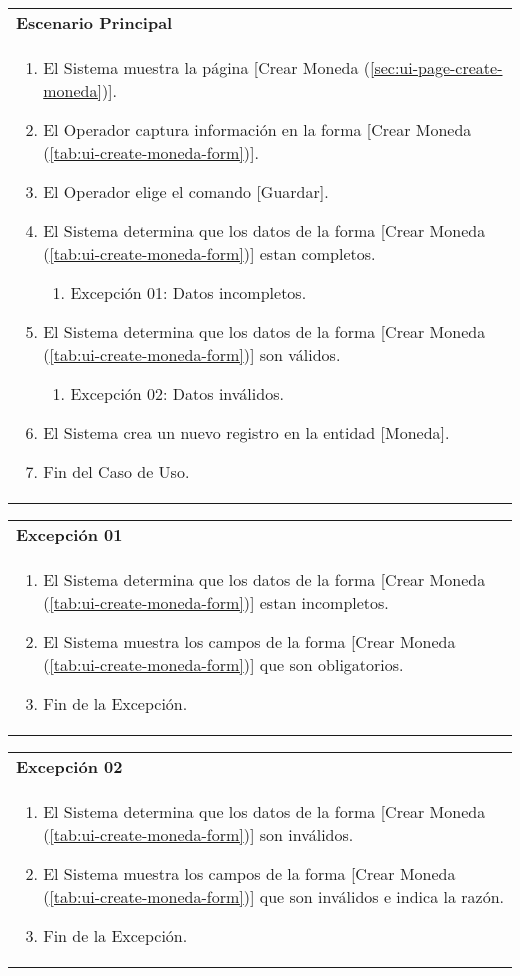 \begin{tabular}{ p{15.5cm} }
	\textbf{Escenario Principal} \\
	\begin{enumerate}
		\item El Sistema muestra la página [Crear Moneda (\ref{sec:ui-page-create-moneda})].
		\item El Operador captura información en la forma [Crear Moneda (\ref{tab:ui-create-moneda-form})].
		\item El Operador elige el comando [Guardar].
		\item El Sistema determina que los datos de la forma [Crear Moneda (\ref{tab:ui-create-moneda-form})] estan completos.
			\begin{enumerate}
				\item Excepción 01: Datos incompletos.
			\end{enumerate}
		\item El Sistema determina que los datos de la forma [Crear Moneda (\ref{tab:ui-create-moneda-form})] son válidos.
			\begin{enumerate}
				\item Excepción 02: Datos inválidos.
			\end{enumerate}
		\item El Sistema crea un nuevo registro en la entidad [Moneda].
		\item Fin del Caso de Uso.
	\end{enumerate}
\end{tabular}

\begin{tabular}{ p{15.5cm} }
	\textbf{Excepción 01} \\
	\begin{enumerate}
		\item El Sistema determina que los datos de la forma [Crear Moneda (\ref{tab:ui-create-moneda-form})] estan incompletos.
		\item El Sistema muestra los campos de la forma [Crear Moneda (\ref{tab:ui-create-moneda-form})] que son obligatorios.
		\item Fin de la Excepción.
	\end{enumerate}
\end{tabular}

\begin{tabular}{ p{15.5cm} }
	\textbf{Excepción 02} \\
	\begin{enumerate}
		\item El Sistema determina que los datos de la forma [Crear Moneda (\ref{tab:ui-create-moneda-form})] son inválidos.
		\item El Sistema muestra los campos de la forma [Crear Moneda (\ref{tab:ui-create-moneda-form})] que son inválidos e indica la razón.
		\item Fin de la Excepción.
	\end{enumerate}
\end{tabular}


